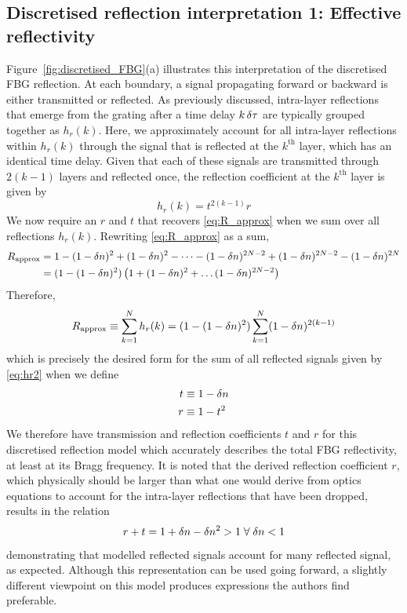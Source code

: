 \subsection{Discretised reflection interpretation 1: Effective reflectivity}
%
Figure~\ref{fig:discretised_FBG}(a) illustrates this interpretation of the discretised FBG reflection. 
At each boundary, a signal propagating forward or backward is either transmitted or reflected. 
As previously discussed, intra-layer reflections that emerge from the grating after a time delay $k \, \delta \tau$ are typically grouped together as $h_r(k)$. 
Here, we approximately account for all intra-layer reflections within $h_r(k)$ through the signal that is reflected at the $k^\text{th}$ layer, which has an identical time delay. 
Given that each of these signals are transmitted through $2(k-1)$ layers and reflected once, the reflection coefficient at the $k^{\text{th}}$ layer is given by
%
\begin{equation}
    \label{eq:hr2}
    h_r(k) = t^{2(k-1)}r
\end{equation}
%
We now require an $r$ and $t$ that recovers \eqref{eq:R_approx} when we sum over all reflections $h_r(k)$. Rewriting \eqref{eq:R_approx} as a sum,
%
\begin{align*}
    R_\text{approx} &= 1 - (1-\delta n)^2 + (1-\delta n)^2 - \dots - (1-\delta n)^{2N-2} + (1-\delta n)^{2N-2} - (1-\delta n)^{2N}
    \\
    &= (1-(1-\delta n)^2) \left( 1 + (1-\delta n)^2 + \dots (1-\delta n)^{2N-2} \right)
\end{align*}
%
Therefore,
%
\begin{equation*}
    R_\text{approx} \equiv \sum_{k=1}^{N} h_r(k) = (1-(1-\delta n)^2)\sum_{k=1}^{N} (1-\delta n)^{2(k-1)}
\end{equation*}
%
%
which is precisely the desired form for the sum of all reflected signals given by \eqref{eq:hr2} when we define
%
\begin{align*}
    t &\equiv 1-\delta n
    \\
    r &\equiv 1-t^2
\end{align*}
%
We therefore have transmission and reflection coefficients $t$ and $r$ for this discretised reflection model which accurately describes the total FBG reflectivity, at least at its Bragg frequency. 
It is noted that the derived reflection coefficient $r$, which physically should be larger than what one would derive from optics equations to account for the intra-layer reflections that have been dropped, results in the relation
%
\begin{equation*}
    r + t = 1 + \delta n - \delta n^2 > 1 \; \forall \; \delta n<1
\end{equation*}
%
demonstrating that modelled reflected signals account for many reflected signal, as expected. 
Although this representation can be used going forward, a slightly different viewpoint on this model produces expressions the authors find preferable.
%
\par
%
